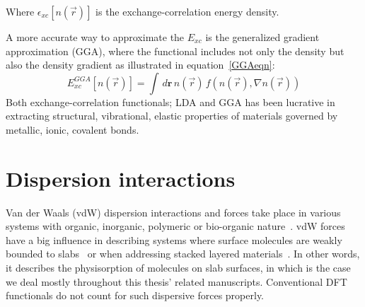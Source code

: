 Where $\epsilon_{xc}[n(\vec{r})]$ is the exchange-correlation energy density. 

A more accurate way to approximate the $E_{xc}$ is the generalized gradient approximation (GGA), where the functional includes not only the density but also the density gradient as illustrated in equation~\ref{GGAeqn}:
\begin{equation}
\label{GGAeqn} 
E_{xc}^{GGA}[n(\vec{r})] = \int \!   \, d\textbf{r} \, n(\vec{r}) \, f (n(\vec{r}), \nabla n(\vec{r}))
\end{equation}
Both exchange-correlation functionals; LDA and GGA has been lucrative in extracting structural, vibrational, elastic properties of materials governed by metallic, ionic, covalent bonds.

\section{Dispersion interactions}
Van der Waals (vdW) dispersion interactions and forces take place in various systems with organic, inorganic, polymeric or bio-organic nature~\cite{vdWreview}. vdW forces have a big influence in describing systems where surface molecules are weakly bounded to slabs~\cite{Rydberg2000, Langreth2005, vdWreview, Axel2014} or when addressing stacked layered materials~\cite{Geim2013}. In other words, it describes the physisorption of molecules on slab surfaces, in which is the case we deal mostly throughout this thesis' related manuscripts. Conventional DFT functionals do not count for such dispersive forces properly. 

